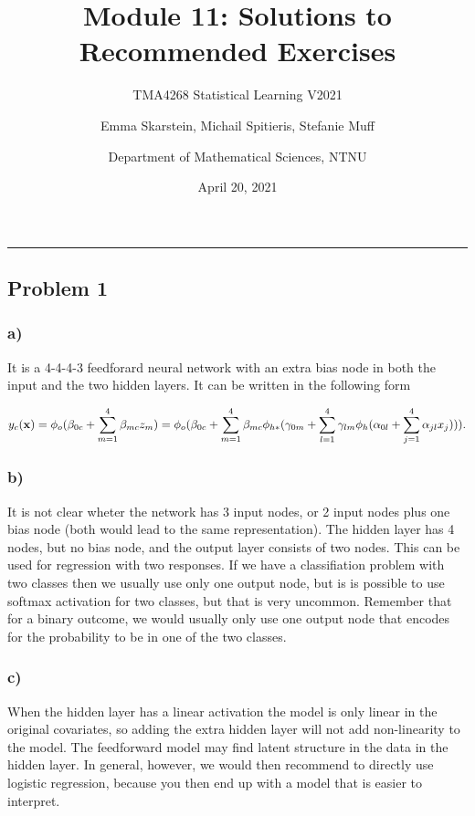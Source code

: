 \documentclass[]{article}
\title{Module 11: Solutions to Recommended Exercises}
\subtitle{TMA4268 Statistical Learning V2021}
\author{Emma Skarstein, Michail Spitieris, Stefanie Muff \and Department of Mathematical Sciences, NTNU}
\date{April 20, 2021}
\begin{document}
\maketitle

\begin{center}\rule{0.5\linewidth}{0.5pt}\end{center}

\hypertarget{problem-1}{%
\subsection{Problem 1}\label{problem-1}}

\hypertarget{a}{%
\subsubsection{a)}\label{a}}

It is a 4-4-4-3 feedforard neural network with an extra bias node in
both the input and the two hidden layers. It can be written in the
following form

\[
y_c({\bf x})=\phi_o(\beta_{0c}+\sum_{m=1}^4 \beta_{mc}z_{m})=\phi_o(\beta_{0c}+\sum_{m=1}^4 \beta_{mc}\phi_{h*}(\gamma_{0m}+\sum_{l=1}^4 \gamma_{lm}\phi_h(\alpha_{0l}+\sum_{j=1}^4 \alpha_{jl}x_{j}))).
\]

\hypertarget{b}{%
\subsubsection{b)}\label{b}}

It is not clear wheter the network has 3 input nodes, or 2 input nodes
plus one bias node (both would lead to the same representation). The
hidden layer has 4 nodes, but no bias node, and the output layer
consists of two nodes. This can be used for regression with two
responses. If we have a classifiation problem with two classes then we
usually use only one output node, but is is possible to use softmax
activation for two classes, but that is very uncommon. Remember that for
a binary outcome, we would usually only use one output node that encodes
for the probability to be in one of the two classes.

\hypertarget{c}{%
\subsubsection{c)}\label{c}}

When the hidden layer has a linear activation the model is only linear
in the original covariates, so adding the extra hidden layer will not
add non-linearity to the model. The feedforward model may find latent
structure in the data in the hidden layer. In general, however, we would
then recommend to directly use logistic regression, because you then end
up with a model that is easier to interpret.
\end{document}
